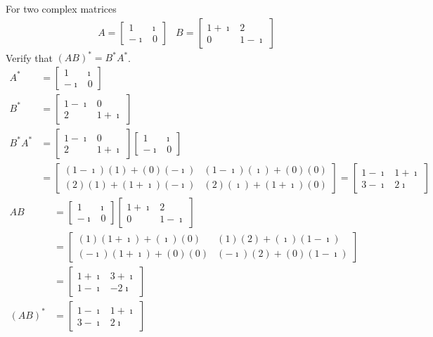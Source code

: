 \begin{exmp}
For two complex matrices
\begin{align*}
& A =
\begin{bmatrix}
1 & \imath \\
-\imath & 0
\end{bmatrix} 
& B =
\begin{bmatrix}
1+\imath & 2 \\
0 & 1-\imath
\end{bmatrix}
\end{align*}
Verify that $(AB)^* = B^*A^*$.
\begin{align*}
A^* &=
\begin{bmatrix}
1 & \imath \\
-\imath & 0
\end{bmatrix} \\
B^* &=
\begin{bmatrix}
1-\imath & 0 \\
2 & 1+\imath
\end{bmatrix} \\
B^*A^* &= 
\begin{bmatrix}
1-\imath & 0 \\
2 & 1+\imath
\end{bmatrix} 
\begin{bmatrix}
1 & \imath \\
-\imath & 0
\end{bmatrix} \\
&=
\begin{bmatrix}
(1-\imath)(1) + (0)(-\imath) & (1-\imath)(\imath) + (0)(0)  \\
(2)(1) + (1+\imath)(-\imath) & (2)(\imath) + (1+\imath)(0)
\end{bmatrix} 
=
\begin{bmatrix}
1-\imath & 1+\imath \\
3-\imath & 2\imath
\end{bmatrix} 
\end{align*}
\begin{align*}
AB &= 
\begin{bmatrix}
1 & \imath \\
-\imath & 0
\end{bmatrix} 
\begin{bmatrix}
1+\imath & 2 \\
0 & 1-\imath
\end{bmatrix} \\
&= 
\begin{bmatrix}
(1)(1+\imath)+(\imath)(0) & (1)(2) + (\imath)(1-\imath) \\
(-\imath)(1+\imath)+(0)(0) & (-\imath)(2) + (0)(1-\imath)
\end{bmatrix} \\
&= 
\begin{bmatrix}
1+\imath & 3+\imath \\
1-\imath & -2\imath
\end{bmatrix} \\
(AB)^* &= 
\begin{bmatrix}
1-\imath & 1+\imath \\
3-\imath & 2\imath
\end{bmatrix}
\end{align*}
\end{exmp}

